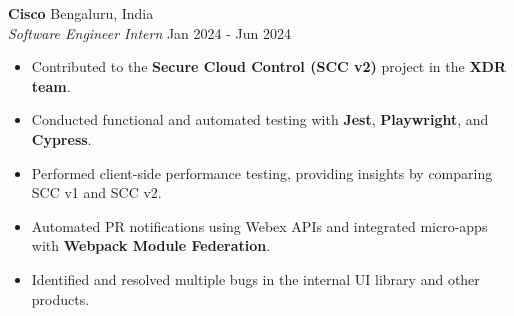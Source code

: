 \documentclass[a4paper]{article}
\newcommand{\bulletSep} { \vspace{2.5mm} }
\newcommand{\experienceItem}[5]{
    \textbf{#1} \hfill #2 \\
    \textit{#3} \hfill #4 \\
    #5
}
\begin{document}

\experienceItem{Cisco}{Bengaluru, India}{Software Engineer Intern}{Jan 2024 - Jun 2024}{
    \begin{itemize}
        \item Contributed to the \textbf{Secure Cloud Control (SCC v2)} project in the \textbf{XDR team}.
        \item Conducted functional and automated testing with \textbf{Jest}, \textbf{Playwright}, and \textbf{Cypress}.
        \item Performed client-side performance testing, providing insights by comparing SCC v1 and SCC v2.
        \item Automated PR notifications using Webex APIs and integrated micro-apps with \textbf{Webpack Module Federation}.
        \item Identified and resolved multiple bugs in the internal UI library and other products.
    \end{itemize}
}
\bulletSep


\end{document}
